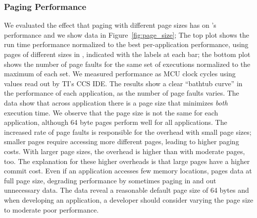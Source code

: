 \subsubsection{\sys Paging Performance}
\label{sec:results_memory_management}

We evaluated the effect that paging with different page sizes has on \sys's performance and we show data in Figure~\ref{fig:page_size}; The top plot shows the run time performance normalized to the best per-application performance, using pages of different sizes in \sys, indicated with the labels at each bar; the bottom plot shows the number of page faults for the same set of executions normalized to the maximum of each set. We measured performance as MCU clock cycles using values read out by TI's CCS IDE. The results show a clear ``bathtub curve'' in the performance of each application, as the number of page faults varies. The data show that across application there is a page size that minimizes \emph{both} execution time. We observe that the page size is not the same for each application, although 64 byte pages perform well for all applications. The increased rate of page faults is responsible for the overhead with small page sizes; smaller pages require accessing more different pages, leading to higher paging costs. With larger page sizes, the overhead is higher than with moderate pages, too. The explanation for these higher overheads is that large pages have a higher commit cost. Even if an application accesses few memory locations, \sys pages data at full page size, degrading performance by sometimes paging in and out unnecessary data. The data reveal a reasonable default page size of 64 bytes and when developing an application, a developer should consider varying the page size to moderate poor performance.

